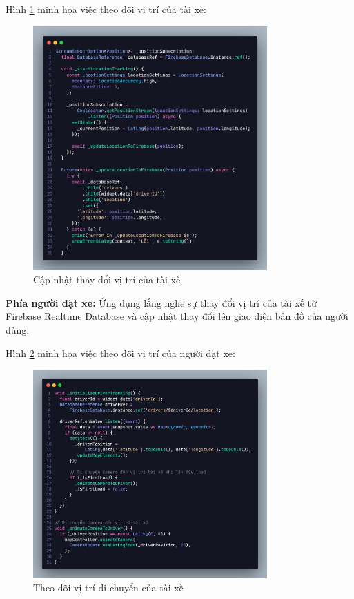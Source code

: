 \documentclass[../DoAn.tex]{subfiles}
\begin{document}
Hình \ref{fig:Theo_doi_vi_tri_tai_xe} minh họa việc theo dõi vị trí của tài xế:
\begin{figure}[H]
  \centering
  \includegraphics[width=0.8\textwidth]{Hinhve/Theo_doi_vi_tri_tai_xe.png}
  \caption{Cập nhật thay đổi vị trí của tài xế}
  \label{fig:Theo_doi_vi_tri_tai_xe}
\end{figure}

\textbf{Phía người đặt xe:} Ứng dụng lắng nghe sự thay đổi vị trí của tài xế từ Firebase Realtime Database và cập nhật thay đổi lên giao diện bản đồ của người dùng.

Hình \ref{fig:Theo_doi_vi_tri_nguoi_dat_xe} minh họa việc theo dõi vị trí của người đặt xe:
\begin{figure}[H]
  \centering
  \includegraphics[width=0.8\textwidth]{Hinhve/Theo_doi_vi_tri_nguoi_dat_xe.png}
  \caption{Theo dõi vị trí di chuyển của tài xế}
  \label{fig:Theo_doi_vi_tri_nguoi_dat_xe}
\end{figure}
\end{document}
